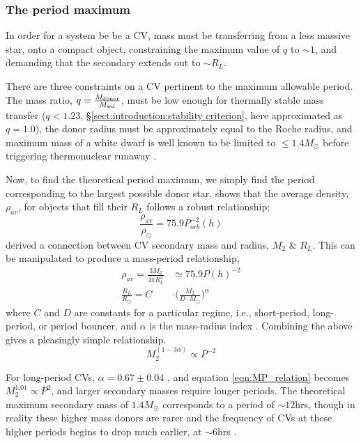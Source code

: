 \subsubsection{The period maximum}
\label{sect:introduction:period maximum}
In order for a system be be a CV, mass must be transferring from a less massive star, onto a compact object, constraining the maximum value of $q$ to $\sim1$, and demanding that the secondary extends out to $\sim R_L$.

There are three constraints on a CV pertinent to the maximum allowable period. The mass ratio, $q = \frac{M_{\rm donor}}{M_{\rm wd}}$, must be low enough for thermally stable mass transfer ($q < 1.23$, \S\ref{sect:introduction:stability criterion}, here approximated as $q = 1.0$), the donor radius must be approximately equal to the Roche radius, and maximum mass of a white dwarf is well known to be limited to $\le 1.4M_{\odot}$ before triggering thermonuclear runaway \citep{chandrasekhar1942}.

Now, to find the theoretical period maximum, we simply find the period corresponding to the largest possible donor star. \citet{warner1995} shows that the average density, $\rho_{av}$, for objects that fill their $R_L$ follows a robust relationship;
\begin{equation}
    \frac{\rho_{av}}{\rho_{\odot}} = 75.9 P_{orb}^{-2}(h)
\end{equation}
\citet{knigge11} derived a connection between CV secondary mass and radius, $M_2$ \& $R_L$. This can be manipulated to produce a mass-period relationship,
\begin{align}
    \rho_{av} = \frac{3 M_2}{4 \pi R_L^3} &\simeq 75.9 P(h)^{-2} \\
    \frac{R_L}{R_\odot} = C &\cdot \Big( \frac{M_2}{D \cdot M_\odot} \Big) ^{\alpha}
\end{align}
where $C$ and $D$ are constants for a particular regime, i.e., short-period, long-period, or period bouncer, and $\alpha$ is the mass-radius index \citep{Knigge2011b}.
Combining the above gives a pleasingly simple relationship.
\begin{equation}
\label{eqn:MP_relation}
    M_2^{(1-3\alpha)} \propto P^{-2}
\end{equation}

For long-period CVs, $\alpha = 0.67\pm0.04$ \citep{knigge11}, and equation \ref{eqn:MP_relation} becomes $M_2^{1.01} \propto P^{2}$, and larger secondary masses require longer periods. The theoretical maximum secondary mass of $1.4 M_{\odot}$ corresponds to a period of $\sim12$hrs, though in reality these higher mass donors are rarer and the frequency of CVs at these higher periods begins to drop much earlier, at $\sim6$hrs \citep{gaensicke2009}.


